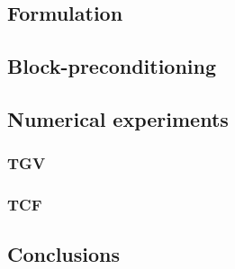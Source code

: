 \documentclass[compress,11 pt,t]{beamer}
\begin{document}
\subsection{Formulation}


\subsection{Block-preconditioning}

\subsection{Numerical experiments}

\subsubsection{TGV}

\subsubsection{TCF}

\subsection{Conclusions}

\end{document}
